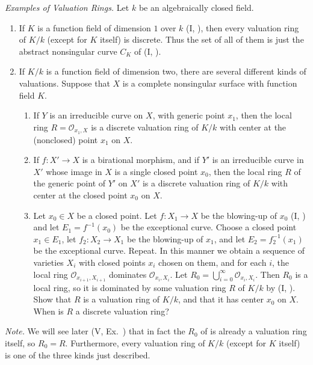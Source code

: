 {{\begin{description}[leftmargin=2.4em,labelindent=0pt,topsep=4pt,itemsep=4pt,parsep=0pt]
\item[\hypertarget{ex-II-4.12}{}\textbf{4.12.}] \emph{Examples of Valuation Rings.} Let $k$ be an algebraically closed field.
\begin{enumerate}[label=(\alph*),leftmargin=1.6em,nosep]
\item If $K$ is a function field of dimension $1$ over $k$ (I, ), then every valuation ring of $K/k$ (except for $K$ itself) is discrete. Thus the set of all of them is just the abstract nonsingular curve $C_K$ of (I, ).
\item If $K/k$ is a function field of dimension two, there are several different kinds of valuations. Suppose that $X$ is a complete nonsingular surface with function field $K$.
\begin{enumerate}[label=(\arabic*),leftmargin=1.6em,nosep]
\item If $Y$ is an irreducible curve on $X$, with generic point $x_1$, then the local ring $R=\mathcal O_{x_1,X}$ is a discrete valuation ring of $K/k$ with center at the (nonclosed) point $x_1$ on $X$.
\item If $f\colon X'\to X$ is a birational morphism, and if $Y'$ is an irreducible curve in $X'$ whose image in $X$ is a single closed point $x_0$, then \hypertarget{err-II-4-12b2}{}the local ring $R$ of the generic point of $Y'$ on $X'$ is a discrete valuation ring of $K/k$ with center at the closed point $x_0$ on $X$.
\item[\hypertarget{ex-II-4.12b3}{}(3)] Let $x_0\in X$ be a closed point. Let $f\colon X_1\to X$ be the blowing-up of $x_0$ (I, ) and let $E_1=f^{-1}(x_0)$ be the exceptional curve. Choose a closed point $x_1\in E_1$, let $f_2\colon X_2\to X_1$ be the blowing-up of $x_1$, and let $E_2=f_2^{-1}(x_1)$ be the exceptional curve. Repeat. In this manner we obtain a sequence of varieties $X_i$ with closed points $x_i$ chosen on them, and for each $i$, the local ring $\mathcal O_{x_{i+1},X_{i+1}}$ dominates $\mathcal O_{x_i,X_i}$. Let $R_0=\bigcup_{i=0}^{\infty}\mathcal O_{x_i,X_i}$. Then $R_0$ is a local ring, so it is dominated by some valuation ring $R$ of $K/k$ by (I, ). Show that $R$ is a valuation ring of $K/k$, and that it has center $x_0$ on $X$. When is $R$ a discrete valuation ring?
\end{enumerate}
\end{enumerate}
\emph{Note.} We will see later (V, Ex.~) that in fact the $R_0$ of  is already a valuation ring itself, so $R_0=R$. Furthermore, every valuation ring of $K/k$ (except for $K$ itself) is one of the three kinds just described.
\end{description}}

}

